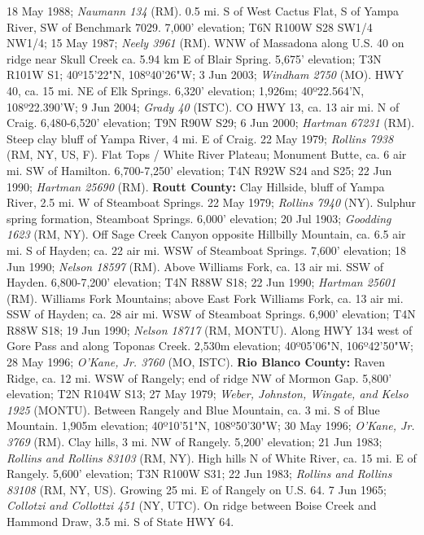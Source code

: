 18 May 1988; \textit{Naumann 134} (RM).
0.5 mi. S of West Cactus Flat, S of Yampa River, SW of Benchmark 7029. 7,000'
elevation; T6N R100W S28 SW1/4 NW1/4; 15 May 1987; \textit{Neely 3961} (RM).
WNW of Massadona along U.S. 40 on ridge near Skull Creek ca. 5.94 km E of Blair
Spring. 5,675' elevation; T3N R101W S1; 40º15'22"N, 108º40'26"W;
3 Jun 2003; \textit{Windham 2750} (MO).
HWY 40, ca. 15 mi. NE of Elk Springs. 6,320' elevation; 1,926m;
40º22.564'N, 108º22.390'W; 9 Jun 2004; \textit{Grady 40} (ISTC).
CO HWY 13, ca. 13 air mi. N of Craig. 6,480-6,520' elevation; T9N R90W S29;
6 Jun 2000; \textit{Hartman 67231} (RM).
Steep clay bluff of Yampa River, 4 mi. E of Craig. 22 May 1979;
\textit{Rollins 7938} (RM, NY, US, F).
Flat Tops / White River Plateau; Monument Butte, ca. 6 air mi. SW of Hamilton.
6,700-7,250' elevation;  T4N R92W S24 and S25; 22 Jun 1990;
\textit{Hartman 25690} (RM).
  \textbf{Routt County:}
Clay Hillside, bluff of Yampa River, 2.5 mi. W of Steamboat Springs.
22 May 1979; \textit{Rollins 7940} (NY).
Sulphur spring formation, Steamboat Springs. 6,000' elevation; 20 Jul 1903;
\textit{Goodding 1623} (RM, NY).
Off Sage Creek Canyon opposite Hillbilly Mountain, ca. 6.5 air mi. S of Hayden;
ca. 22 air mi. WSW of Steamboat Springs. 7,600' elevation; 18 Jun 1990;
\textit{Nelson 18597} (RM).
Above Williams Fork, ca. 13 air mi. SSW of Hayden. 6,800-7,200' elevation;
T4N R88W S18; 22 Jun 1990; \textit{Hartman 25601} (RM).
Williams Fork Mountains; above East Fork Williams Fork, ca. 13 air mi. SSW of
Hayden; ca. 28 air mi. WSW of Steamboat Springs. 6,900' elevation; T4N R88W S18;
19 Jun 1990; \textit{Nelson 18717} (RM, MONTU).
Along HWY 134 west of Gore Pass and along Toponas Creek. 2,530m elevation;
40º05'06"N, 106º42'50"W; 28 May 1996; \textit{O'Kane, Jr. 3760} (MO, ISTC).
  \textbf{Rio Blanco County:}
Raven Ridge, ca. 12 mi. WSW of Rangely; end of ridge NW of Mormon Gap.
5,800' elevation; T2N R104W S13; 27 May 1979;
\textit{Weber, Johnston, Wingate, and Kelso 1925} (MONTU).
Between Rangely and Blue Mountain, ca. 3 mi. S of Blue Mountain.
1,905m elevation; 40º10'51"N, 108º50'30"W; 30 May 1996;
\textit{O'Kane, Jr. 3769} (RM).
Clay hills, 3 mi. NW of Rangely. 5,200' elevation; 21 Jun 1983;
\textit{Rollins and Rollins 83103} (RM, NY).
High hills N of White River, ca. 15 mi. E of Rangely. 5,600' elevation;
T3N R100W S31; 22 Jun 1983; \textit{Rollins and Rollins 83108} (RM, NY, US).
Growing 25 mi. E of Rangely on U.S. 64. 7 Jun 1965;
\textit{Collotzi and Collottzi 451} (NY, UTC).
On ridge between Boise Creek and Hammond Draw, 3.5 mi. S of State HWY 64.
